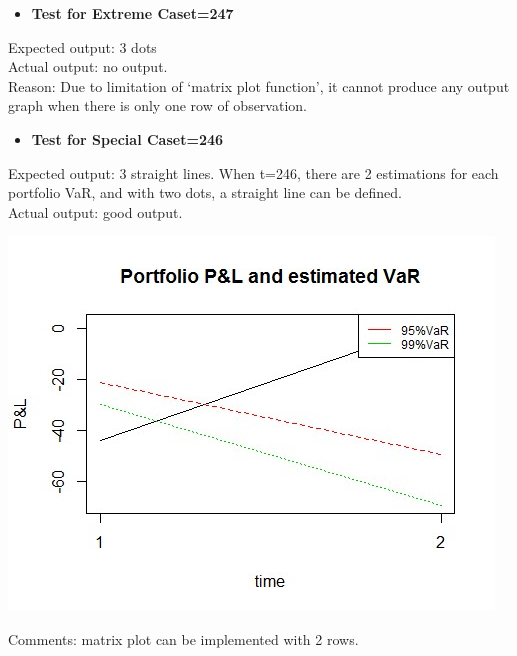     \begin{itemize}
    \item \textbf{Test for Extreme Case\:t=247}
    \end{itemize}
    Expected output: 3 dots\\
    Actual output: no output.\\
    Reason: Due to limitation of `matrix plot function', it cannot produce any output graph when there is only one row of observation.\\

    \begin{itemize}
    \item \textbf{Test for Special Case\:t=246}
    \end{itemize}
    Expected output: 3 straight lines. When t=246, there are 2 estimations for each portfolio VaR, and with two dots, a straight line can be defined.\\
    Actual output: good output.\\
    \begin{center}
    \includegraphics[scale=1]{6.jpg}%
    \end{center}
    Comments: matrix plot can be implemented with 2 rows.\\


